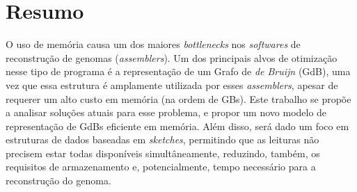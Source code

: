 \section{Resumo}

O uso de memória causa um dos maiores \emph{bottlenecks} nos \emph{softwares} de reconstrução
de genomas (\emph{assemblers}). Um dos principais alvos de otimização nesse tipo de programa
é a representação de um Grafo de \emph{de Bruijn} (GdB), uma vez que essa estrutura é amplamente utilizada
por esses \emph{assemblers}, apesar de requerer um alto custo em memória (na ordem de GBs).
Este trabalho se propõe a analisar soluções atuais para esse problema, e propor um novo modelo
de representação de GdBs eficiente em memória. Além disso, será dado um foco em estruturas de dados
baseadas em \emph{sketches}, permitindo que as leituras não precisem estar todas disponíveis simultâneamente,
reduzindo, também, os requisitos de armazenamento e, potencialmente, tempo necessário para a reconstrução
do genoma.